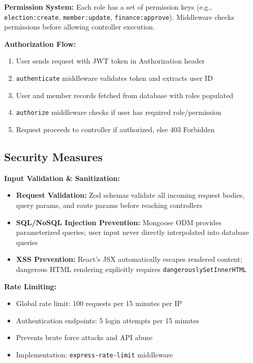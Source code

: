 \documentclass[12pt,a4paper]{article}
\begin{document}
\textbf{Permission System:}
Each role has a set of permission keys (e.g., \texttt{election:create}, \texttt{member:update}, \texttt{finance:approve}). Middleware checks permissions before allowing controller execution.

\textbf{Authorization Flow:}
\begin{enumerate}[noitemsep]
  \item User sends request with JWT token in Authorization header
  \item \texttt{authenticate} middleware validates token and extracts user ID
  \item User and member records fetched from database with roles populated
  \item \texttt{authorize} middleware checks if user has required role/permission
  \item Request proceeds to controller if authorized, else 403 Forbidden
\end{enumerate}

\subsection{Security Measures}

\textbf{Input Validation \& Sanitization:}
\begin{itemize}[noitemsep]
  \item \textbf{Request Validation:} Zod schemas validate all incoming request bodies, query params, and route params before reaching controllers
  \item \textbf{SQL/NoSQL Injection Prevention:} Mongoose ODM provides parameterized queries; user input never directly interpolated into database queries
  \item \textbf{XSS Prevention:} React's JSX automatically escapes rendered content; dangerous HTML rendering explicitly requires \texttt{dangerously\-Set\-Inner\-HTML}
\end{itemize}

\textbf{Rate Limiting:}
\begin{itemize}[noitemsep]
  \item Global rate limit: 100 requests per 15 minutes per IP
  \item Authentication endpoints: 5 login attempts per 15 minutes
  \item Prevents brute force attacks and API abuse
  \item Implementation: \texttt{express-rate-limit} middleware
\end{itemize}
\end{document}
